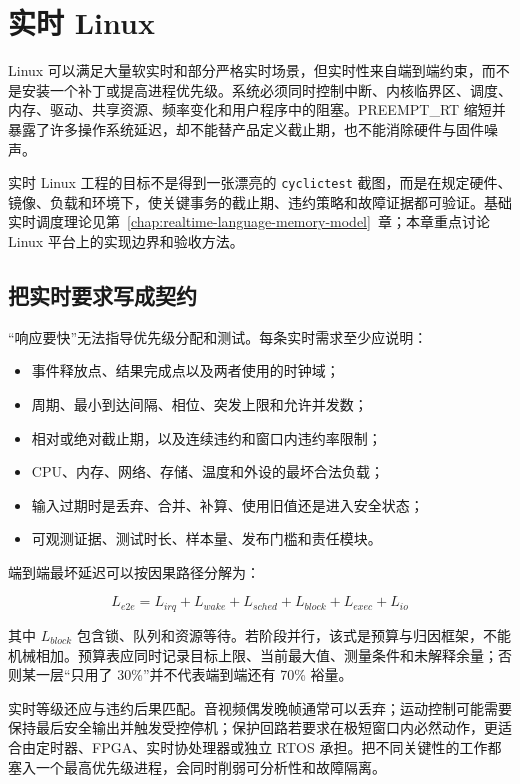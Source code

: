 \chapter{实时 Linux}
\label{chap:realtime-linux}

Linux 可以满足大量软实时和部分严格实时场景，但实时性来自端到端约束，而不是安装一个补丁或提高进程优先级。系统必须同时控制中断、内核临界区、调度、内存、驱动、共享资源、频率变化和用户程序中的阻塞。PREEMPT\_RT 缩短并暴露了许多操作系统延迟，却不能替产品定义截止期，也不能消除硬件与固件噪声。

实时 Linux 工程的目标不是得到一张漂亮的 \texttt{cyclictest} 截图，而是在规定硬件、镜像、负载和环境下，使关键事务的截止期、违约策略和故障证据都可验证。基础实时调度理论见\mbox{第~\ref{chap:realtime-language-memory-model}~章}；本章重点讨论 Linux 平台上的实现边界和验收方法。

\section{把实时要求写成契约}

“响应要快”无法指导优先级分配和测试。每条实时需求至少应说明：

\begin{itemize}
  \item 事件释放点、结果完成点以及两者使用的时钟域；
  \item 周期、最小到达间隔、相位、突发上限和允许并发数；
  \item 相对或绝对截止期，以及连续违约和窗口内违约率限制；
  \item CPU、内存、网络、存储、温度和外设的最坏合法负载；
  \item 输入过期时是丢弃、合并、补算、使用旧值还是进入安全状态；
  \item 可观测证据、测试时长、样本量、发布门槛和责任模块。
\end{itemize}

端到端最坏延迟可以按因果路径分解为：

\begin{equation}
  L_{e2e}=L_{irq}+L_{wake}+L_{sched}+L_{block}+L_{exec}+L_{io}
\end{equation}

其中 $L_{block}$ 包含锁、队列和资源等待。若阶段并行，该式是预算与归因框架，不能机械相加。预算表应同时记录目标上限、当前最大值、测量条件和未解释余量；否则某一层“只用了 30\%”并不代表端到端还有 70\% 裕量。

实时等级还应与违约后果匹配。音视频偶发晚帧通常可以丢弃；运动控制可能需要保持最后安全输出并触发受控停机；保护回路若要求在极短窗口内必然动作，更适合由定时器、FPGA、实时协处理器或独立 RTOS 承担。把不同关键性的工作都塞入一个最高优先级进程，会同时削弱可分析性和故障隔离。

